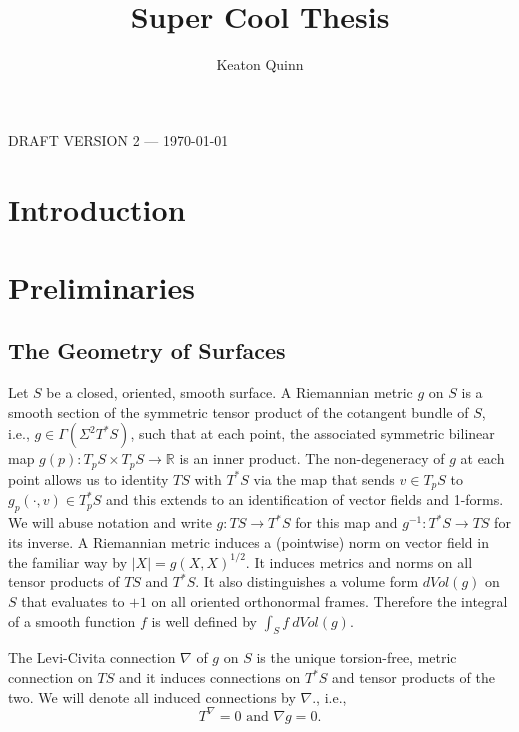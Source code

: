 \documentclass{amsart}
\newcommand{\R}{\mathbb{R}}
\begin{document}
\title{Super Cool Thesis}

\author{Keaton Quinn}

\maketitle

\begin{center} {\sf DRAFT VERSION 2 --- {\today} } \end{center}



\section{Introduction}

\section{Preliminaries}


\subsection{The Geometry of Surfaces}

Let $S$ be a closed, oriented, smooth surface. 
A Riemannian metric $g$ on $S$ is a smooth section of the symmetric tensor product of the cotangent bundle of $S$, i.e., $g \in \Gamma(\Sigma^2T^*S)$, such that at each point, the associated symmetric bilinear map  $g(p): T_pS \times T_pS \to \R$ is an inner product.
The non-degeneracy of $g$ at each point allows us to identity $TS$ with $T^*S$ via the map that sends $v \in T_pS$ to $g_p(\cdot  , v) \in T_p^*S$ and this extends to an identification of vector fields and 1-forms. 
We will abuse notation and write $g: TS \to T^*S$ for this map and $g^{-1}: T^*S \to TS$ for its inverse. 
A Riemannian metric induces a (pointwise) norm on vector field in the familiar way by $|X| = g(X,X)^{1/2}$. 
It induces metrics and norms on all tensor products of $TS$ and $T^*S$. It also distinguishes a volume form $dVol(g)$ on $S$ that evaluates to $+1$ on all oriented orthonormal frames. 
Therefore the integral of a smooth function $f$ is well defined by $\int_S f \ dVol(g)$.


The Levi-Civita connection $\nabla$ of $g$ on $S$ is the unique torsion-free, metric connection on $TS$ and it induces connections on $T^*S$ and tensor products of the two. 
We will denote all induced connections by $\nabla$., i.e., 
\[
T^\nabla = 0 \text{ and } \nabla g = 0.
\]
\end{document}
